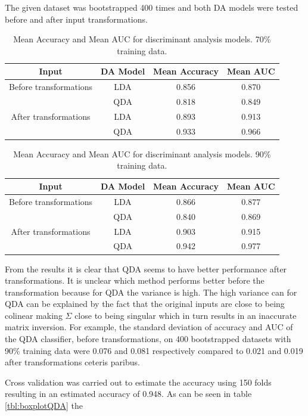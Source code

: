 \documentclass[../../project.tex]{subfiles}
\begin{document}
	The given dataset was bootstrapped 400 times and both DA models were tested before and after input transformations.
	\begin{table}[h!]
		\centering
		\begin{tabular}{cccc}
			Input & DA Model & Mean Accuracy & Mean AUC \\
			\midrule
			Before transformations
			& LDA & 0.856 & 0.870 \\
		    & QDA & 0.818 & 0.849 \\
			\midrule
			After transformations
			& LDA & 0.893 & 0.913 \\
			& QDA & 0.933 & 0.966 \\
		\end{tabular}
		\caption{Mean Accuracy and Mean AUC for discriminant analysis models. 70\% training data.}
		\label{tab:discanal_table_70}
	\end{table}
	\begin{table}[h!]
		\centering
		\begin{tabular}{cccc}
			Input & DA Model & Mean Accuracy & Mean AUC \\
			\midrule
			Before transformations
			& LDA & 0.866 & 0.877 \\
		    & QDA & 0.840 & 0.869 \\
			\midrule
			After transformations
			& LDA & 0.903 & 0.915 \\
			& QDA & 0.942 & 0.977 \\
		\end{tabular}
		\caption{Mean Accuracy and Mean AUC for discriminant analysis models. 90\% training data.}
		\label{tab:discanal_table_90}
	\end{table}
	From the results it is clear that QDA seems to have better performance after transformations. It is unclear which method performs better before the transformation because for QDA the variance is high. The high variance can for QDA can be explained by the fact that the original inputs are close to being colinear making $\Sigma$ close to being singular which in turn results in an inaccurate matrix inversion. For example, the standard deviation of accuracy and AUC of the QDA classifier, before transformations, on 400 bootstrapped datasets with 90\% training data were 0.076 and 0.081 respectively compared to 0.021 and 0.019 after transformations ceteris paribus.
	
	Cross validation was carried out to estimate the accuracy using 150 folds resulting in an estimated accuracy of 0.948. As can be seen in table \ref{tbl:boxplotQDA} the 
	
\end{document}
